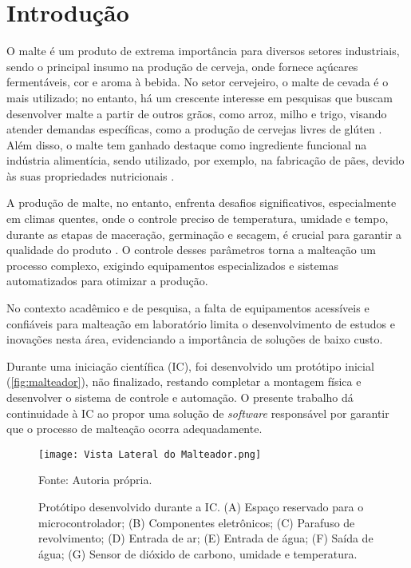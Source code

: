 \chapter[Introdução]{Introdução}

O malte é um produto de extrema importância para diversos setores industriais, sendo o principal insumo na produção de cerveja, onde fornece açúcares fermentáveis, cor e aroma à bebida. No setor cervejeiro, o malte de cevada é o mais utilizado; no entanto, há um crescente interesse em pesquisas que buscam desenvolver malte a partir de outros grãos, como arroz, milho e trigo, visando atender demandas específicas, como a produção de cervejas livres de glúten \cite{CECCARONI2019}. Além disso, o malte tem ganhado destaque como ingrediente funcional na indústria alimentícia, sendo utilizado, por exemplo, na fabricação de pães, devido às suas propriedades nutricionais \cite{KOISTINEN2020}.

A produção de malte, no entanto, enfrenta desafios significativos, especialmente em climas quentes, onde o controle preciso de temperatura, umidade e tempo, durante as etapas de maceração, germinação e secagem, é crucial para garantir a qualidade do produto \cite{KOVALOVA2024}. O controle desses parâmetros torna a malteação um processo complexo, exigindo equipamentos especializados e sistemas automatizados para otimizar a produção. 

No contexto acadêmico e de pesquisa, a falta de equipamentos acessíveis e confiáveis para malteação em laboratório limita o desenvolvimento de estudos e inovações nesta área, evidenciando a importância de soluções de baixo custo.

Durante uma iniciação científica (IC), foi desenvolvido um protótipo inicial (\autoref{fig:malteador}), não finalizado, restando completar a montagem física e desenvolver o sistema de controle e automação. O presente trabalho dá continuidade à IC ao propor uma solução de \textit{software} responsável por garantir que o processo de malteação ocorra adequadamente. 

\begin{figure}[ht]
    \centering
    \caption{Protótipo desenvolvido durante a IC. (A) Espaço reservado para o microcontrolador; (B) Componentes eletrônicos; (C) Parafuso de revolvimento; (D) Entrada de ar; (E) Entrada de água; (F) Saída de água; (G) Sensor de dióxido de carbono, umidade e temperatura.}  
    \label{fig:malteador}
    \texttt{[image: Vista Lateral do Malteador.png]}

    {\centering\footnotesize Fonte: Autoria própria.\par}
\end{figure}

